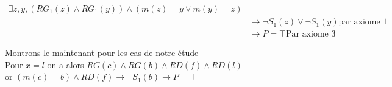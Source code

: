 \documentclass{article}
\begin{document}
\begin{align*}
  \exists z,y, (RG_1(z) \wedge RG_1(y)) \wedge (m(z) =y \vee m(y) =z) \\
   & \rightarrow \neg S_1(z) \vee \neg S_1(y)\text{par axiome 1}      \\
   & \rightarrow P = \top \text{Par axiome 3}
\end{align*}

Montrons le maintenant pour les cas de notre étude\\
Pour $x=l$
on a alors $RG(c)\wedge RG(b) \wedge RD(f) \wedge RD(l)$\\
or $(m(c)=b) \wedge RD(f) \rightarrow \neg S_1(b) \rightarrow P = \top$
\end{document}
